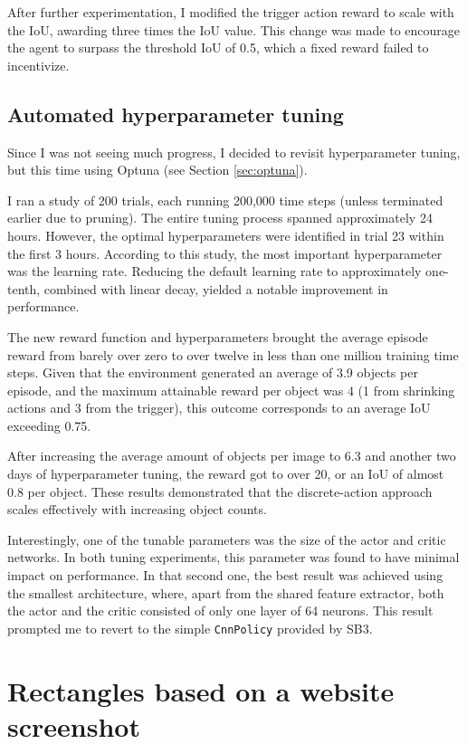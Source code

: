 \documentclass[
  digital,     %
  oneside,     %
  nosansbold,  %
  nocolorbold, %
  lof,         %
  lot,         %
]{fithesis4}
\begin{document}
After further experimentation, I modified the trigger action reward to scale with the IoU, awarding three times the IoU value. This change was made to encourage the agent to surpass the threshold IoU of 0.5, which a fixed reward failed to incentivize.

\subsection{Automated hyperparameter tuning}

Since I was not seeing much progress, I decided to revisit hyperparameter tuning, but this time using Optuna (see Section \ref{sec:optuna}).

I ran a study of 200 trials, each running 200,000 time steps (unless terminated earlier due to pruning). The entire tuning process spanned approximately 24 hours. However, the optimal hyperparameters were identified in trial 23 within the first 3 hours. According to this study, the most important hyperparameter was the learning rate. Reducing the default learning rate to approximately one-tenth, combined with linear decay, yielded a notable improvement in performance.

The new reward function and hyperparameters brought the average episode reward from barely over zero to over twelve in less than one million training time steps. Given that the environment generated an average of 3.9 objects per episode, and the maximum attainable reward per object was 4 (1 from shrinking actions and 3 from the trigger), this outcome corresponds to an average IoU exceeding 0.75.

After increasing the average amount of objects per image to 6.3 and another two days of hyperparameter tuning, the reward got to over 20, or an IoU of almost 0.8 per object. These results demonstrated that the discrete-action approach scales effectively with increasing object counts.

Interestingly, one of the tunable parameters was the size of the actor and critic networks. In both tuning experiments, this parameter was found to have minimal impact on performance. In that second one, the best result was achieved using the smallest architecture, where, apart from the shared feature extractor, both the actor and the critic consisted of only one layer of 64 neurons. This result prompted me to revert to the simple \texttt{CnnPolicy} provided by SB3.

\section{Rectangles based on a website screenshot}
\end{document}
